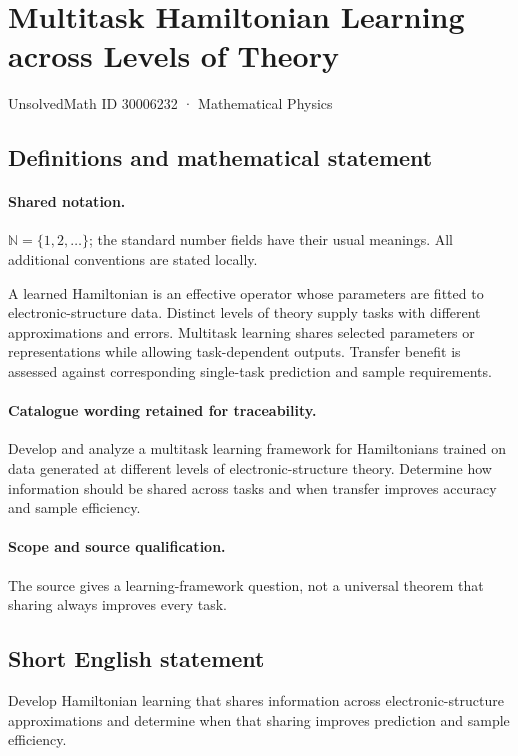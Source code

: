 \documentclass[11pt]{article}
\begin{document}
\setcounter{section}{30006231}
\section{Multitask Hamiltonian Learning across Levels of Theory}\label{30006232}
{\small UnsolvedMath ID 30006232 · Mathematical Physics}
\subsection{Definitions and mathematical statement}

\paragraph{Shared notation.}$\mathbb N=\{1,2,\ldots\}$; the standard number fields have their usual meanings. All additional conventions are stated locally.


A learned Hamiltonian is an effective operator whose parameters are fitted to electronic-structure data. Distinct levels of theory supply tasks with different approximations and errors. Multitask learning shares selected parameters or representations while allowing task-dependent outputs. Transfer benefit is assessed against corresponding single-task prediction and sample requirements.

\paragraph{Catalogue wording retained for traceability.}
Develop and analyze a multitask learning framework for Hamiltonians trained on data generated at different levels of electronic-structure theory. Determine how information should be shared across tasks and when transfer improves accuracy and sample efficiency.

\paragraph{Scope and source qualification.}The source gives a learning-framework question, not a universal theorem that sharing always improves every task.
\subsection{Short English statement}
Develop Hamiltonian learning that shares information across electronic-structure approximations and determine when that sharing improves prediction and sample efficiency.
\end{document}

